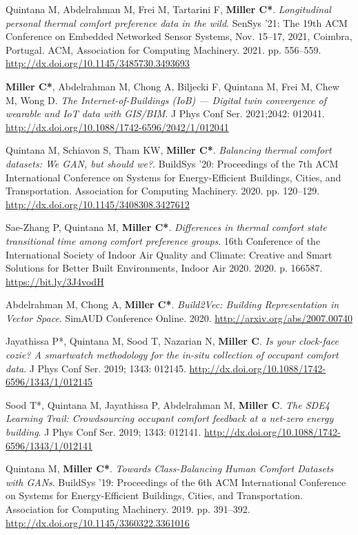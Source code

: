 \documentclass[10pt,a4paper]{article}
\begin{document}
\begin{small}
\begin{etaremune}
\item
Quintana M, Abdelrahman M, Frei M, Tartarini F, \textbf{Miller C*}. \emph{Longitudinal personal thermal comfort preference data in the wild}. SenSys ’21: The 19th ACM Conference on Embedded Networked Sensor Systems, Nov. 15–17, 2021, Coimbra, Portugal. ACM, Association for Computing Machinery. 2021. pp. 556–559. \url{http://dx.doi.org/10.1145/3485730.3493693}
\item
\textbf{Miller C*}, Abdelrahman M, Chong A, Biljecki F, Quintana M, Frei M, Chew M, Wong D. \emph{The Internet-of-Buildings (IoB) — Digital twin convergence of wearable and IoT data with GIS/BIM}. J Phys Conf Ser. 2021;2042: 012041. \url{http://dx.doi.org/10.1088/1742-6596/2042/1/012041}
\item
Quintana M, Schiavon S, Tham KW, \textbf{Miller C*}. \emph{Balancing thermal comfort datasets: We GAN, but should we?}. BuildSys '20: Proceedings of the 7th ACM International Conference on Systems for Energy-Efficient Buildings, Cities, and Transportation. Association for Computing Machinery. 2020. pp. 120–129. \url{http://dx.doi.org/10.1145/3408308.3427612}
\item
Sae-Zhang P, Quintana M, \textbf{Miller C*}. \emph{Differences in thermal comfort state transitional time among comfort preference groups}. 16th Conference of the International Society of Indoor Air Quality and Climate: Creative and Smart Solutions for Better Built Environments, Indoor Air 2020. 2020. p. 166587. \url{https://bit.ly/3J4vodH}
\item
Abdelrahman M, Chong A, \textbf{Miller C*}. \emph{Build2Vec: Building Representation in Vector Space}. SimAUD Conference Online. 2020. \url{http://arxiv.org/abs/2007.00740} 
\item
Jayathissa P*, Quintana M, Sood T, Nazarian N, \textbf{Miller C}. \emph{Is your clock-face cozie? A smartwatch methodology for the in-situ collection of occupant comfort data}. J Phys Conf Ser. 2019; 1343: 012145. \url{http://dx.doi.org/10.1088/1742-6596/1343/1/012145}
\item
Sood T*, Quintana M, Jayathissa P, Abdelrahman M, \textbf{Miller C}. \emph{The SDE4 Learning Trail: Crowdsourcing occupant comfort feedback at a net-zero energy building}. J Phys Conf Ser. 2019; 1343: 012141. \url{http://dx.doi.org/10.1088/1742-6596/1343/1/012141}
\item
Quintana M, \textbf{Miller C*}. \emph{Towards Class-Balancing Human Comfort Datasets with GANs}. BuildSys '19: Proceedings of the 6th ACM International Conference on Systems for Energy-Efficient Buildings, Cities, and Transportation. Association for Computing Machinery. 2019. pp. 391–392. \url{http://dx.doi.org/10.1145/3360322.3361016}

\end{etaremune}
\end{small}
\end{document}
